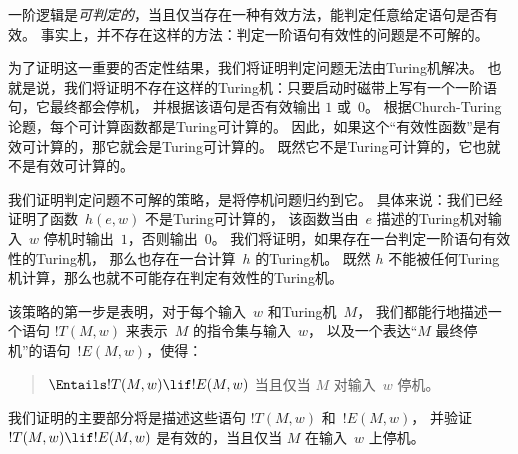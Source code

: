 \documentclass[../../../include/open-logic-section]{subfiles}
\begin{document}

一阶逻辑是\emph{可判定的}，当且仅当存在一种有效方法，能判定任意给定语句是否有效。
事实上，并不存在这样的方法：判定一阶语句有效性的问题是不可解的。

为了证明这一重要的否定性结果，我们将证明判定问题无法由Turing机解决。
也就是说，我们将证明不存在这样的Turing机：只要启动时磁带上写有一个一阶语句，它最终都会停机，
并根据该语句是否有效输出 $1$ 或~$0$。
根据Church-Turing论题，每个可计算函数都是Turing可计算的。
因此，如果这个“有效性函数”是有效可计算的，那它就会是Turing可计算的。
既然它不是Turing可计算的，它也就不是有效可计算的。

我们证明判定问题不可解的策略，是将停机问题归约到它。
具体来说：我们已经证明了函数~$h(e,w)$ 不是Turing可计算的，
该函数当由~$e$ 描述的Turing机对输入~$w$ 停机时输出~$1$，否则输出~$0$。
我们将证明，如果存在一台判定一阶语句有效性的Turing机，
那么也存在一台计算~$h$ 的Turing机。
既然 $h$ 不能被任何Turing机计算，那么也就不可能存在判定有效性的Turing机。

该策略的第一步是表明，对于每个输入~$w$ 和Turing机~$M$，
我们都能行地描述一个语句 $!T(M, w)$ 来表示~$M$ 的指令集与输入~$w$，
以及一个表达“$M$ 最终停机”的语句~$!E(M, w)$，使得：

\begin{quote}
  $\Entails !T(M, w) \lif !E(M,w)$ 当且仅当 $M$ 对输入~$w$ 停机。
\end{quote}

我们证明的主要部分将是描述这些语句 $!T(M, w)$ 和~$!E(M, w)$，
并验证 $!T(M, w) \lif !E(M, w)$ 是有效的，当且仅当 $M$ 在输入~$w$ 上停机。
\end{document}
